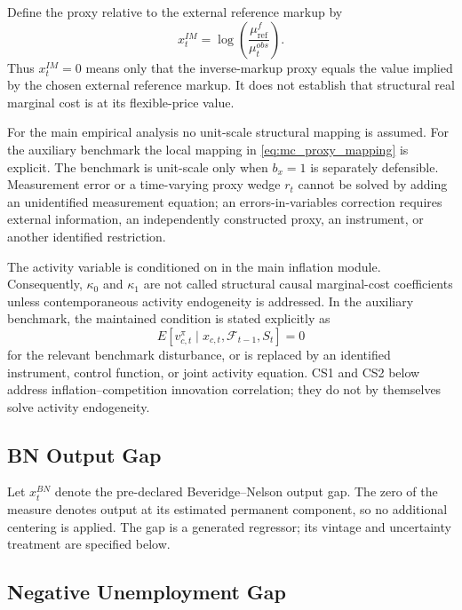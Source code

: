 \documentclass[11pt]{article}
\begin{document}
Define the proxy relative to the external reference markup by
\begin{equation}
\boxed{
x_t^{IM}
=
\log\left(\frac{\mu_{\mathrm{ref}}^f}{\mu_t^{obs}}\right).
}
\label{eq:inverse_markup_gap}
\end{equation}
Thus $x_t^{IM}=0$ means only that the inverse-markup proxy equals the value implied by the chosen external reference markup. It does not establish that structural real marginal cost is at its flexible-price value.

For the main empirical analysis no unit-scale structural mapping is assumed. For the auxiliary benchmark the local mapping in \cref{eq:mc_proxy_mapping} is explicit. The benchmark is unit-scale only when $b_x=1$ is separately defensible. Measurement error or a time-varying proxy wedge $r_t$ cannot be solved by adding an unidentified measurement equation; an errors-in-variables correction requires external information, an independently constructed proxy, an instrument, or another identified restriction.

The activity variable is conditioned on in the main inflation module. Consequently, $\kappa_0$ and $\kappa_1$ are not called structural causal marginal-cost coefficients unless contemporaneous activity endogeneity is addressed. In the auxiliary benchmark, the maintained condition is stated explicitly as
\begin{equation}
E[v_{c,t}^{\pi}\mid x_{c,t},\mathcal F_{t-1},S_t]=0
\label{eq:activity_orthogonality}
\end{equation}
for the relevant benchmark disturbance, or is replaced by an identified instrument, control function, or joint activity equation. CS1 and CS2 below address inflation--competition innovation correlation; they do not by themselves solve activity endogeneity.

\subsection{BN Output Gap}

Let $x_t^{BN}$ denote the pre-declared Beveridge--Nelson output gap. The zero of the measure denotes output at its estimated permanent component, so no additional centering is applied. The gap is a generated regressor; its vintage and uncertainty treatment are specified below.

\subsection{Negative Unemployment Gap}
\end{document}
